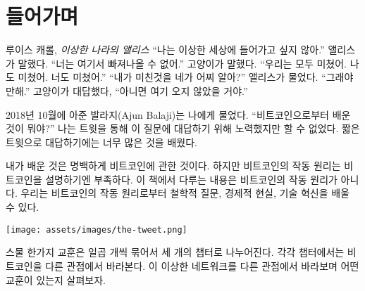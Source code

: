\chapter*{들어가며}
\label{ch:introduction}

\begin{chapquote}{루이스 캐롤, \textit{이상한 나라의 앨리스}}
	\enquote{나는 이상한 세상에 들어가고 싶지 않아.}  앨리스가 말했다. 
	\enquote{너는 여기서 빠져나올 수 없어.}  고양이가 말했다. 
	\enquote{우리는 모두 미쳤어. 나도 미쳤어. 너도 미쳤어.} 
	\enquote{내가 미친것을 네가 어찌 알아?}  앨리스가 물었다. 
	\enquote{그래야만해.} 고양이가 대답했다, 
	\enquote{아니면 여기 오지 않았을 거야.}
\end{chapquote}

2018년 10월에 아준 발라지(Ajun Balaji)는 나에게 물었다.
\enquote{비트코인으로부터 배운 것이 뭐야?} 나는 트윗을 통해 이 질문에 대답하기 위해 노력했지만 할 수 없었다.
짧은 트윗으로 대답하기에는 너무 많은 것을 배웠다.

내가 배운 것은 명백하게 비트코인에 관한 것이다. 하지만 비트코인의 작동 원리는 비트코인을 설명하기엔 부족하다.
이 책에서 다루는 내용은 비트코인의 작동 원리가 아니다. 우리는 비트코인의 작동 원리로부터 철학적
질문, 경제적 현실, 기술 혁신을 배울 수 있다.


\begin{center}
	\texttt{[image: assets/images/the-tweet.png]}
\end{center}

스물 한가지 교훈은 일곱 개씩 묶어서 세 개의 챕터로 나누어진다. 각각 챕터에서는 비트코인을 다른 관점에서
바라본다. 이 이상한 네트워크를 다른 관점에서 바라보며 어떤 교훈이 있는지 살펴보자.

